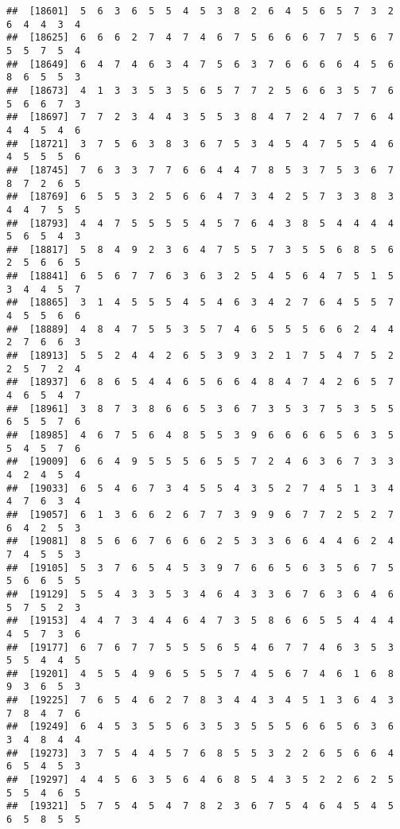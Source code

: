 \documentclass[
]{book}
\begin{document}
\begin{verbatim}
##  [18601]  5  6  3  6  5  5  4  5  3  8  2  6  4  5  6  5  7  3  2  6  4  4  3  4
##  [18625]  6  6  6  2  7  4  7  4  6  7  5  6  6  6  7  7  5  6  7  5  5  7  5  4
##  [18649]  6  4  7  4  6  3  4  7  5  6  3  7  6  6  6  6  4  5  6  8  6  5  5  3
##  [18673]  4  1  3  3  5  3  5  6  5  7  7  2  5  6  6  3  5  7  6  5  6  6  7  3
##  [18697]  7  7  2  3  4  4  3  5  5  3  8  4  7  2  4  7  7  6  4  4  4  5  4  6
##  [18721]  3  7  5  6  3  8  3  6  7  5  3  4  5  4  7  5  5  4  6  4  5  5  5  6
##  [18745]  7  6  3  3  7  7  6  6  4  4  7  8  5  3  7  5  3  6  7  8  7  2  6  5
##  [18769]  6  5  5  3  2  5  6  6  4  7  3  4  2  5  7  3  3  8  3  4  4  7  5  5
##  [18793]  4  4  7  5  5  5  5  4  5  7  6  4  3  8  5  4  4  4  4  5  6  5  4  3
##  [18817]  5  8  4  9  2  3  6  4  7  5  5  7  3  5  5  6  8  5  6  2  5  6  6  5
##  [18841]  6  5  6  7  7  6  3  6  3  2  5  4  5  6  4  7  5  1  5  3  4  4  5  7
##  [18865]  3  1  4  5  5  5  4  5  4  6  3  4  2  7  6  4  5  5  7  4  5  5  6  6
##  [18889]  4  8  4  7  5  5  3  5  7  4  6  5  5  5  6  6  2  4  4  2  7  6  6  3
##  [18913]  5  5  2  4  4  2  6  5  3  9  3  2  1  7  5  4  7  5  2  2  5  7  2  4
##  [18937]  6  8  6  5  4  4  6  5  6  6  4  8  4  7  4  2  6  5  7  4  6  5  4  7
##  [18961]  3  8  7  3  8  6  6  5  3  6  7  3  5  3  7  5  3  5  5  6  5  5  7  6
##  [18985]  4  6  7  5  6  4  8  5  5  3  9  6  6  6  6  5  6  3  5  5  4  5  7  6
##  [19009]  6  6  4  9  5  5  5  6  5  5  7  2  4  6  3  6  7  3  3  4  2  4  5  4
##  [19033]  6  5  4  6  7  3  4  5  5  4  3  5  2  7  4  5  1  3  4  4  7  6  3  4
##  [19057]  6  1  3  6  6  2  6  7  7  3  9  9  6  7  7  2  5  2  7  6  4  2  5  3
##  [19081]  8  5  6  6  7  6  6  6  2  5  3  3  6  6  4  4  6  2  4  7  4  5  5  3
##  [19105]  5  3  7  6  5  4  5  3  9  7  6  6  5  6  3  5  6  7  5  5  6  6  5  5
##  [19129]  5  5  4  3  3  5  3  4  6  4  3  3  6  7  6  3  6  4  6  5  7  5  2  3
##  [19153]  4  4  7  3  4  4  6  4  7  3  5  8  6  6  5  5  4  4  4  4  5  7  3  6
##  [19177]  6  7  6  7  7  5  5  5  6  5  4  6  7  7  4  6  3  5  3  5  5  4  4  5
##  [19201]  4  5  5  4  9  6  5  5  5  7  4  5  6  7  4  6  1  6  8  9  3  6  5  3
##  [19225]  7  6  5  4  6  2  7  8  3  4  4  3  4  5  1  3  6  4  3  7  8  4  7  6
##  [19249]  6  4  5  3  5  5  6  3  5  3  5  5  5  6  6  5  6  3  6  3  4  8  4  4
##  [19273]  3  7  5  4  4  5  7  6  8  5  5  3  2  2  6  5  6  6  4  6  5  4  5  3
##  [19297]  4  4  5  6  3  5  6  4  6  8  5  4  3  5  2  2  6  2  5  5  5  4  6  5
##  [19321]  5  7  5  4  5  4  7  8  2  3  6  7  5  4  6  4  5  4  5  6  5  8  5  5

\end{verbatim}
\end{document}
